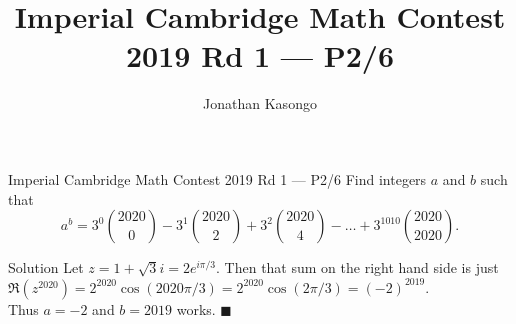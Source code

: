 \documentclass{article}
\author{Jonathan Kasongo}
\title{Imperial Cambridge Math Contest 2019 Rd 1 --- P2/6 }
\begin{document}
\maketitle

\begin{problem}{Imperial Cambridge Math Contest 2019 Rd 1 --- P2/6}
Find integers \( a \) and \( b \) such that
\[a^b = 3^0\binom{2020}{0} - 3^1\binom{2020}{2} + 3^2\binom{2020}{4} - \dots + 3^{1010}\binom{2020}{2020}.\]
\end{problem}

\begin{solution}{Solution}
Let $z = 1 + \sqrt{3}i = 2e^{i\pi/3}$. Then that sum on the right hand
side is just $\Re (z^{2020}) = 2^{2020}\cos(2020\pi/3) =
2^{2020}\cos(2\pi/3) = (-2)^{2019}$.\\

Thus $a=-2$ and $b=2019$ works. $\blacksquare$
\end{solution}
\end{document}
